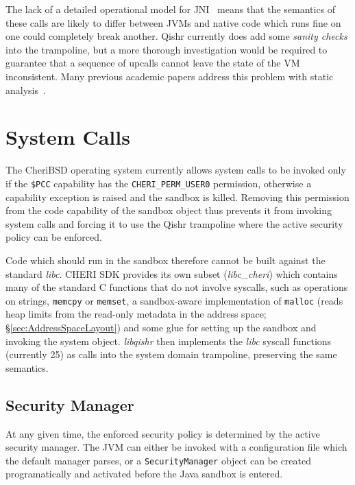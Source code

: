 \documentclass[a4paper,12pt,twoside,openright]{report}
\newcommand{\reg}[1]{\texttt{\$#1}}
\newcommand{\class}[1]{\texttt{#1}}
\newcommand{\tool}[1]{\emph{#1}}
\newcommand{\lib}[1]{\tool{lib#1}}
\begin{document}
The lack of a detailed operational model for JNI~\cite{Tan:2010:JNIFormalModel} means that the semantics of these calls are likely to differ between JVMs and native code which runs fine on one could completely break another. Qishr currently does add some \emph{sanity checks} into the trampoline, but a more thorough investigation would be required to guarantee that a sequence of upcalls cannot leave the state of the VM inconsistent. Many previous academic papers address this problem with static analysis~\cite{Kondoh:2008:FBJ:1390630.1390645, Li:2009:FBE:1653662.1653716, Li:2011:JEC:2048066.2048095}.

\section{System Calls}

The CheriBSD operating system currently allows system calls to be invoked only if the \reg{PCC} capability has the \texttt{CHERI\_PERM\_USER0} permission, otherwise a capability exception is raised and the sandbox is killed. Removing this permission from the code capability of the sandbox object thus prevents it from invoking system calls and forcing it to use the Qishr trampoline where the active security policy can be enforced.

Code which should run in the sandbox therefore cannot be built against the standard \lib{c}. CHERI SDK provides its own subset (\lib{c\_cheri}) which contains many of the standard C functions that do not involve syscalls, such as operations on strings, \texttt{memcpy} or \texttt{memset}, a sandbox-aware implementation of \texttt{malloc} (reads heap limits from the read-only metadata in the address space; \S\ref{sec:AddressSpaceLayout}) and some glue for setting up the sandbox and invoking the system object. \lib{qishr} then implements the \lib{c} syscall functions (currently 25) as calls into the system domain trampoline, preserving the same semantics.

\subsection{Security Manager}

At any given time, the enforced security policy is determined by the active security manager. The JVM can either be invoked with a configuration file which the default manager parses, or a \class{Security\-Manager} object can be created programatically and activated before the Java sandbox is entered.
\end{document}
